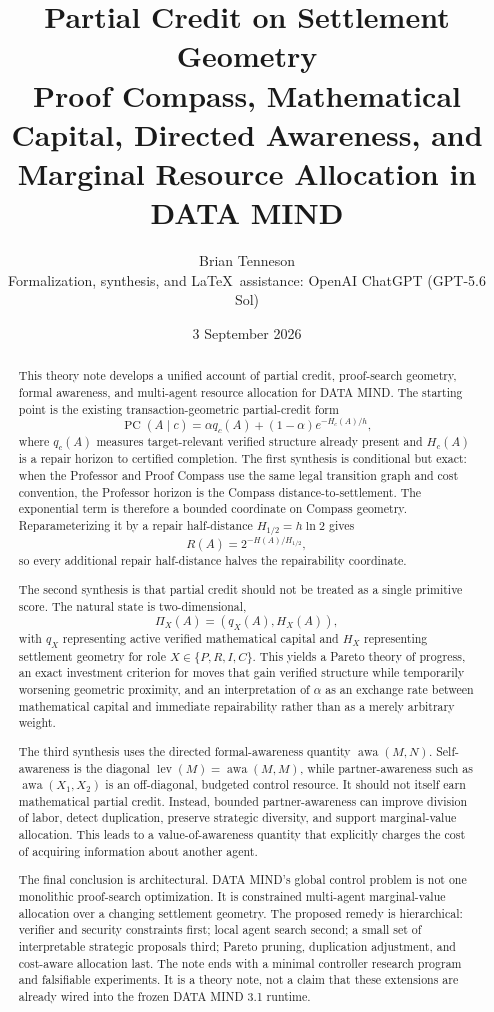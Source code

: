 \documentclass[11pt]{article}
\title{\textbf{Partial Credit on Settlement Geometry}\\[5pt]
\large Proof Compass, Mathematical Capital, Directed Awareness, and Marginal Resource Allocation in DATA MIND}
\author{Brian Tenneson\\
\small Formalization, synthesis, and \LaTeX\ assistance: OpenAI ChatGPT (GPT-5.6 Sol)}
\date{3 September 2026}
\theoremstyle{definition}
\theoremstyle{remark}
\newcommand{\PC}{\operatorname{PC}}
\newcommand{\awa}{\operatorname{awa}}
\newcommand{\lev}{\operatorname{lev}}
\begin{document}
\maketitle

\begin{abstract}
This theory note develops a unified account of partial credit, proof-search geometry, formal awareness, and multi-agent resource allocation for DATA MIND. The starting point is the existing transaction-geometric partial-credit form
\[
\PC(A\mid c)=\alpha q_c(A)+(1-\alpha)e^{-H_c(A)/h},
\]
where $q_c(A)$ measures target-relevant verified structure already present and $H_c(A)$ is a repair horizon to certified completion. The first synthesis is conditional but exact: when the Professor and Proof Compass use the same legal transition graph and cost convention, the Professor horizon is the Compass distance-to-settlement. The exponential term is therefore a bounded coordinate on Compass geometry. Reparameterizing it by a repair half-distance $H_{1/2}=h\ln 2$ gives
\[
R(A)=2^{-H(A)/H_{1/2}},
\]
so every additional repair half-distance halves the repairability coordinate.

The second synthesis is that partial credit should not be treated as a single primitive score. The natural state is two-dimensional,
\[
\Pi_X(A)=(q_X(A),H_X(A)),
\]
with $q_X$ representing active verified mathematical capital and $H_X$ representing settlement geometry for role $X\in\{P,R,I,C\}$. This yields a Pareto theory of progress, an exact investment criterion for moves that gain verified structure while temporarily worsening geometric proximity, and an interpretation of $\alpha$ as an exchange rate between mathematical capital and immediate repairability rather than as a merely arbitrary weight.

The third synthesis uses the directed formal-awareness quantity $\awa(M,N)$. Self-awareness is the diagonal $\lev(M)=\awa(M,M)$, while partner-awareness such as $\awa(X_1,X_2)$ is an off-diagonal, budgeted control resource. It should not itself earn mathematical partial credit. Instead, bounded partner-awareness can improve division of labor, detect duplication, preserve strategic diversity, and support marginal-value allocation. This leads to a value-of-awareness quantity that explicitly charges the cost of acquiring information about another agent.

The final conclusion is architectural. DATA MIND's global control problem is not one monolithic proof-search optimization. It is constrained multi-agent marginal-value allocation over a changing settlement geometry. The proposed remedy is hierarchical: verifier and security constraints first; local agent search second; a small set of interpretable strategic proposals third; Pareto pruning, duplication adjustment, and cost-aware allocation last. The note ends with a minimal controller research program and falsifiable experiments. It is a theory note, not a claim that these extensions are already wired into the frozen DATA MIND 3.1 runtime.
\end{abstract}
\end{document}
